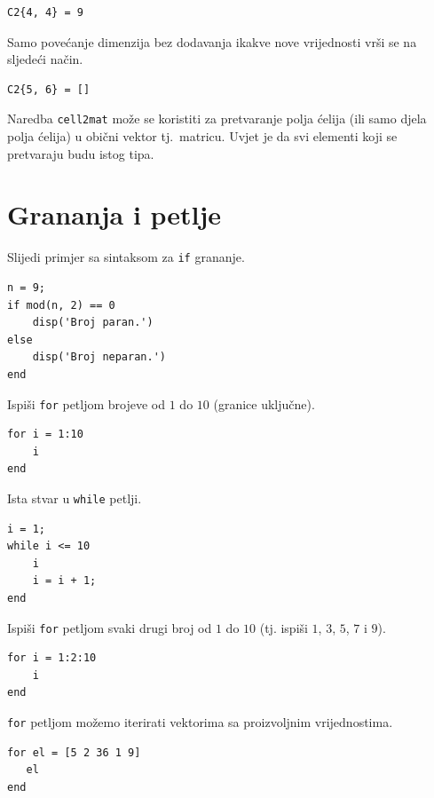 \documentclass[a4paper, 10pt]{article}
\begin{document}
\begin{lstlisting}
C2{4, 4} = 9
\end{lstlisting}

Samo povećanje dimenzija bez dodavanja ikakve nove vrijednosti vrši se na sljedeći način.

\begin{lstlisting}
C2{5, 6} = []
\end{lstlisting}

Naredba \texttt{cell2mat} može se koristiti za pretvaranje polja ćelija (ili samo djela polja ćelija) u obični vektor tj.\ matricu. Uvjet je da svi elementi koji se pretvaraju budu istog tipa.


\section{Grananja i petlje}

Slijedi primjer sa sintaksom za \texttt{if} grananje.

\begin{lstlisting}
n = 9;
if mod(n, 2) == 0
    disp('Broj paran.')
else
    disp('Broj neparan.')
end
\end{lstlisting}

Ispiši \texttt{for} petljom brojeve od $1$ do $10$ (granice uključne).

\begin{lstlisting}
for i = 1:10
    i
end
\end{lstlisting}

Ista stvar u \texttt{while} petlji.

\begin{lstlisting}
i = 1;
while i <= 10
    i
    i = i + 1;
end
\end{lstlisting}

Ispiši \texttt{for} petljom svaki drugi broj od $1$ do $10$ (tj. ispiši $1$, $3$, $5$, $7$ i $9$).

\begin{lstlisting}
for i = 1:2:10
    i
end
\end{lstlisting}

\texttt{for} petljom možemo iterirati vektorima sa proizvoljnim vrijednostima.

\begin{lstlisting}
for el = [5 2 36 1 9]
   el
end
\end{lstlisting}
\end{document}
